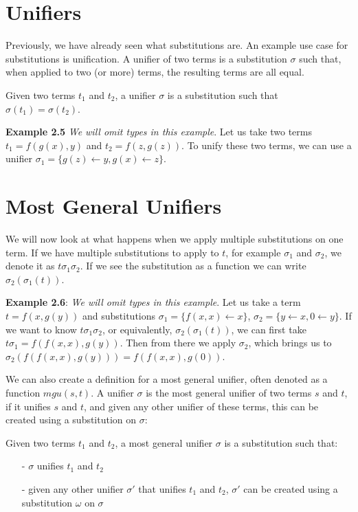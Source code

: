 \section{Unifiers}
Previously, we have already seen what substitutions are. An example use case for substitutions is unification. A unifier of two terms is a substitution $\sigma$ such that, when applied to two (or more) terms, the resulting terms are all equal. 
\begin{definition}
Given two terms $t_1$ and $t_2$, a unifier $\sigma$ is a substitution such that $\sigma(t_1) = \sigma(t_2)$.
\end{definition}

\textbf{Example 2.5} \textit{We will omit types in this example}. Let us take two terms $t_1 = f(g(x), y)$ and $t_2 = f(z, g(z))$. To unify these two terms, we can use a unifier $\sigma_1 = \{ g(z) \leftarrow y, g(x) \leftarrow z \}$.

\section{Most General Unifiers}
We will now look at what happens when we apply multiple substitutions on one term. If we have multiple substitutions to apply to $t$, for example $\sigma_1$ and $\sigma_2$, we denote it as $t\sigma_1\sigma_2$. If we see the substitution as a function we can write $\sigma_2\left( 
\sigma_1(t)\right)$.

\textbf{Example 2.6}: \textit{We will omit types in this example}. Let us take a term $t = f(x, g(y))$ and substitutions $\sigma_1 = \{ f(x, x) \leftarrow x\}$, $\sigma_2 = \{ y \leftarrow x, 0 \leftarrow y \}$. If we want to know $t\sigma_1\sigma_2$, or equivalently, $\sigma_2(\sigma_1(t))$, we can first take $t\sigma_1 = f(f(x, x), g(y))$. Then from there we apply $\sigma_2$, which brings us to $\sigma_2(f(f(x, x), g(y))) = f(f(x, x), g(0))$.

We can also create a definition for a most general unifier, often denoted as a function $\textit{mgu}(s, t)$. A unifier $\sigma$ is the most general unifier of two terms $s$ and $t$, if it unifies $s$ and $t$, and given any other unifier of these terms, this can be created using a substitution on $\sigma$:
\begin{definition}
Given two terms $t_1$ and $t_2$, a most general unifier $\sigma$ is a substitution such that:
\begin{itemize}
    \itemsep -.4em
    \item[-] $\sigma$ unifies $t_1$ and $t_2$
    \item[-] given any other unifier $\sigma'$ that unifies $t_1$ and $t_2$, $\sigma'$ can be created using a substitution $\omega$ on $\sigma$
\end{itemize}
\end{definition}


